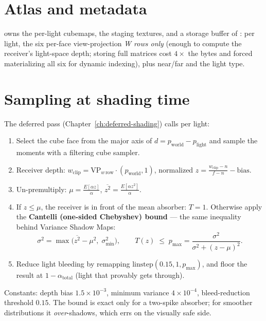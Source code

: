 \section{Atlas and metadata}

 owns the per-light cubemaps, the staging textures, and a
storage buffer of : per light, the six per-face
view-projection \emph{W rows only} (enough to compute the receiver's
light-space depth; storing full matrices cost $4\times$ the bytes and forced
materializing all six for dynamic indexing), plus near/far and the light
type.

\section{Sampling at shading time}

The deferred pass (Chapter~\ref{ch:deferred-shading}) calls
 per light:

\begin{enumerate}
\item Select the cube face from the major axis of
  $d = p_{\text{world}} - p_{\text{light}}$ and sample the moments with a
  filtering cube sampler.
\item Receiver depth: $w_{\text{clip}} = \text{VP}_{w\,\text{row}} \cdot
  (p_{\text{world}}, 1)$, normalized
  $z = \frac{w_{\text{clip}} - n}{f - n} - \text{bias}$.
\item Un-premultiply: $\mu = \frac{E[\alpha z]}{\alpha}$,
  $\overline{z^2} = \frac{E[\alpha z^2]}{\alpha}$.
\item If $z \le \mu$, the receiver is in front of the mean absorber:
  $T = 1$. Otherwise apply the \textbf{Cantelli (one-sided Chebyshev)
  bound} --- the same inequality behind Variance Shadow Maps:
  \[
    \sigma^2 = \max\!\big(\overline{z^2} - \mu^2,\;
    \sigma^2_{\min}\big), \qquad
    T(z) \;\le\; p_{\max} = \frac{\sigma^2}{\sigma^2 + (z - \mu)^2}.
  \]
\item Reduce light bleeding by remapping
  $\text{linstep}(0.15, 1, p_{\max})$, and floor the result at
  $1 - \alpha_{\text{total}}$ (light that provably gets through).
\end{enumerate}

Constants: depth bias $1.5 \times 10^{-3}$, minimum variance
$4 \times 10^{-4}$, bleed-reduction threshold $0.15$. The bound is exact
only for a two-spike absorber; for smoother distributions it
\emph{over}-shadows, which errs on the visually safe side.

